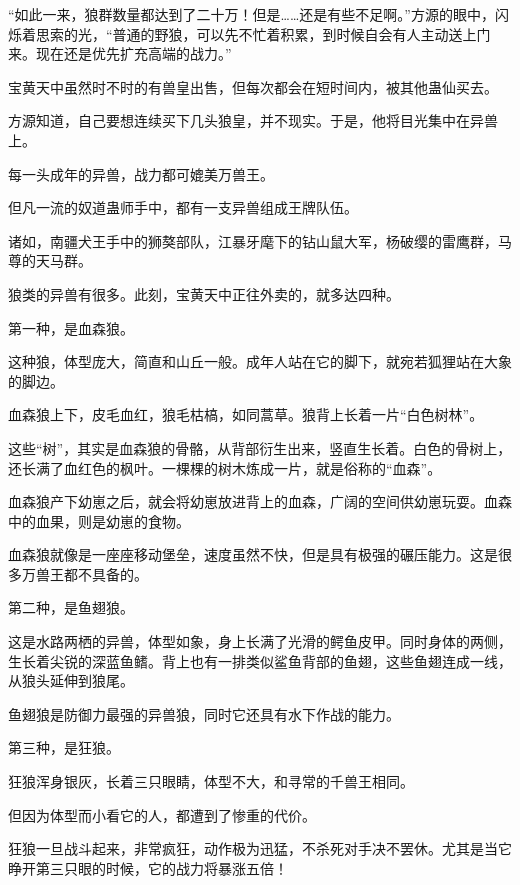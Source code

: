 
\begin{this_body}

“如此一来，狼群数量都达到了二十万！但是……还是有些不足啊。”方源的眼中，闪烁着思索的光，“普通的野狼，可以先不忙着积累，到时候自会有人主动送上门来。现在还是优先扩充高端的战力。”

宝黄天中虽然时不时的有兽皇出售，但每次都会在短时间内，被其他蛊仙买去。

方源知道，自己要想连续买下几头狼皇，并不现实。于是，他将目光集中在异兽上。

每一头成年的异兽，战力都可媲美万兽王。

但凡一流的奴道蛊师手中，都有一支异兽组成王牌队伍。

诸如，南疆犬王手中的狮獒部队，江暴牙麾下的钻山鼠大军，杨破缨的雷鹰群，马尊的天马群。

狼类的异兽有很多。此刻，宝黄天中正往外卖的，就多达四种。

第一种，是血森狼。

这种狼，体型庞大，简直和山丘一般。成年人站在它的脚下，就宛若狐狸站在大象的脚边。

血森狼上下，皮毛血红，狼毛枯槁，如同蒿草。狼背上长着一片“白色树林”。

这些“树”，其实是血森狼的骨骼，从背部衍生出来，竖直生长着。白色的骨树上，还长满了血红色的枫叶。一棵棵的树木炼成一片，就是俗称的“血森”。

血森狼产下幼崽之后，就会将幼崽放进背上的血森，广阔的空间供幼崽玩耍。血森中的血果，则是幼崽的食物。

血森狼就像是一座座移动堡垒，速度虽然不快，但是具有极强的碾压能力。这是很多万兽王都不具备的。

第二种，是鱼翅狼。

这是水路两栖的异兽，体型如象，身上长满了光滑的鳄鱼皮甲。同时身体的两侧，生长着尖锐的深蓝鱼鳍。背上也有一排类似鲨鱼背部的鱼翅，这些鱼翅连成一线，从狼头延伸到狼尾。

鱼翅狼是防御力最强的异兽狼，同时它还具有水下作战的能力。

第三种，是狂狼。

狂狼浑身银灰，长着三只眼睛，体型不大，和寻常的千兽王相同。

但因为体型而小看它的人，都遭到了惨重的代价。

狂狼一旦战斗起来，非常疯狂，动作极为迅猛，不杀死对手决不罢休。尤其是当它睁开第三只眼的时候，它的战力将暴涨五倍！


\end{this_body}
